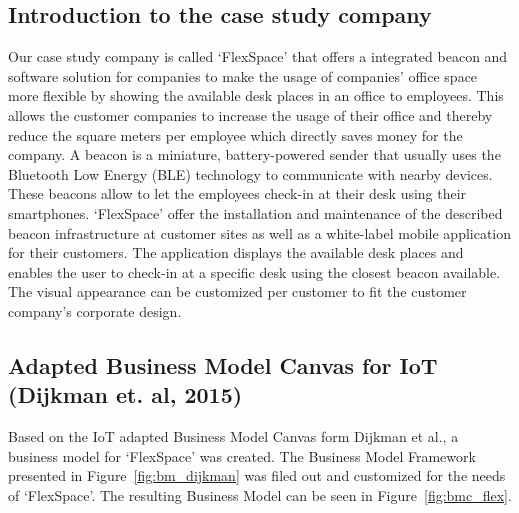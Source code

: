 	

	\subsection{Introduction to the case study company}
		Our case study company is called `FlexSpace' that offers a integrated beacon and software solution for companies to make the usage of companies' office space more flexible by showing the available desk places in an office to employees. This allows the customer companies to increase the usage of their office and thereby reduce the square meters per employee which directly saves money for the company. A beacon is a miniature, battery-powered sender that usually uses the Bluetooth Low Energy (BLE) technology to communicate with nearby devices. These beacons allow to let the employees check-in at their desk using their smartphones. `FlexSpace' offer the installation and maintenance of the described beacon infrastructure at customer sites as well as a white-label mobile application for their customers. The application displays the available desk places and enables the user to check-in at a specific desk using the closest beacon available. The visual appearance can be customized per customer to fit the customer company's corporate design.


	\subsection{Adapted Business Model Canvas for IoT (Dijkman et. al, 2015)}

	Based on the IoT adapted Business Model Canvas form Dijkman et al., a business model for `FlexSpace' was created. The Business Model Framework presented in Figure~\ref{fig:bm_dijkman} was filed out and customized for the needs of `FlexSpace'. The resulting Business Model can be seen in Figure~\ref{fig:bmc_flex}.


